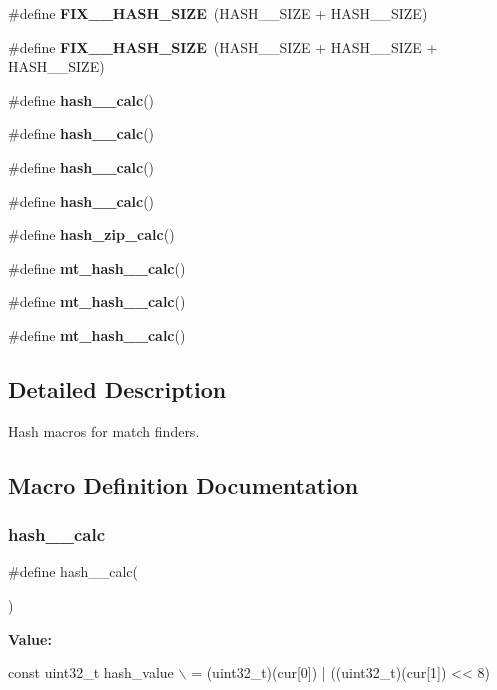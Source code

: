 \begin{DoxyCompactItemize}
$$\#define {\bfseries F\+I\+X\+\_\+\_\+\+H\+A\+S\+H\+\_\+\+S\+I\+ZE}~(H\+A\+S\+H\+\_\+\_\+\+S\+I\+ZE + H\+A\+S\+H\+\_\+\_\+\+S\+I\+ZE)
\item 
\mbox{\label{lz__encoder__hash_8h_a7d528f01009e71bf83c879725fd4db5a}} 
\#define {\bfseries F\+I\+X\+\_\+\_\+\+H\+A\+S\+H\+\_\+\+S\+I\+ZE}~(H\+A\+S\+H\+\_\+\_\+\+S\+I\+ZE + H\+A\+S\+H\+\_\+\_\+\+S\+I\+ZE + H\+A\+S\+H\+\_\+\_\+\+S\+I\+ZE)
\item 
\#define {\bfseries hash\+\_\+\_\+calc}()
\item 
\#define {\bfseries hash\+\_\+\_\+calc}()
\item 
\#define {\bfseries hash\+\_\+\_\+calc}()
\item 
\#define {\bfseries hash\+\_\+\_\+calc}()
\item 
\#define {\bfseries hash\+\_\+zip\+\_\+calc}()
\item 
\#define {\bfseries mt\+\_\+hash\+\_\+\_\+calc}()
\item 
\#define {\bfseries mt\+\_\+hash\+\_\+\_\+calc}()
\item 
\#define {\bfseries mt\+\_\+hash\+\_\+\_\+calc}()
\end{DoxyCompactItemize}


\subsection{Detailed Description}
Hash macros for match finders. 



\subsection{Macro Definition Documentation}
\mbox{\label{lz__encoder__hash_8h_a31e055d3d2ab2b538a9b8f5b902dcf28}} 
\subsubsection{hash\+\_\+\_\+calc}
{\footnotesize\ttfamily \#define hash\+\_\+\_\+calc(\begin{DoxyParamCaption}{ }\end{DoxyParamCaption})}

{\bfseries Value\+:}
\begin{DoxyCode}
\textcolor{keyword}{const} uint32\_t hash\_value \(\backslash\)
                        = (uint32\_t)(cur[0]) | ((uint32\_t)(cur[1]) << 8)
\end{DoxyCode}
\mbox{\label{lz__encoder__hash_8h_a94d6243a41e5cc22431cd692cddeb5fb}} 
